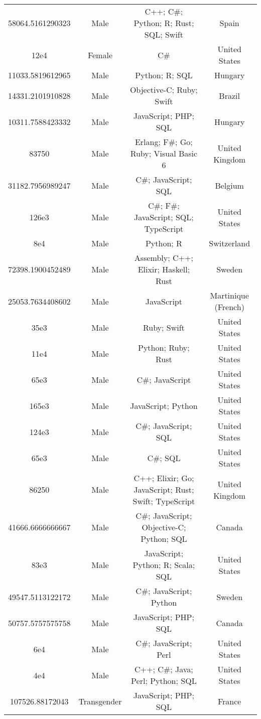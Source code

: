 \begin{center}
\begin{tabular}{ |c|c|c|c| }
58064.5161290323  &  Male  &  C++; C\#; Python; R; Rust; SQL; Swift  &  Spain  \\ 
12e4  &  Female  &  C\#  &  United States  \\ 
11033.5819612965  &  Male  &  Python; R; SQL  &  Hungary  \\ 
14331.2101910828  &  Male  &  Objective-C; Ruby; Swift  &  Brazil  \\ 
10311.7588423332  &  Male  &  JavaScript; PHP; SQL  &  Hungary  \\ 
83750  &  Male  &  Erlang; F\#; Go; Ruby; Visual Basic 6  &  United Kingdom  \\ 
31182.7956989247  &  Male  &  C\#; JavaScript; SQL  &  Belgium  \\ 
126e3  &  Male  &  C\#; F\#; JavaScript; SQL; TypeScript  &  United States  \\ 
8e4  &  Male  &  Python; R  &  Switzerland  \\ 
72398.1900452489  &  Male  &  Assembly; C++; Elixir; Haskell; Rust  &  Sweden  \\ 
25053.7634408602  &  Male  &  JavaScript  &  Martinique (French)  \\ 
35e3  &  Male  &  Ruby; Swift  &  United States  \\ 
11e4  &  Male  &  Python; Ruby; Rust  &  United States  \\ 
65e3  &  Male  &  C\#; JavaScript  &  United States  \\ 
165e3  &  Male  &  JavaScript; Python  &  United States  \\ 
124e3  &  Male  &  C\#; JavaScript; SQL  &  United States  \\ 
65e3  &  Male  &  C\#; SQL  &  United States  \\ 
86250  &  Male  &  C++; Elixir; Go; JavaScript; Rust; Swift; TypeScript  &  United Kingdom  \\ 
41666.6666666667  &  Male  &  C\#; JavaScript; Objective-C; Python; SQL  &  Canada  \\ 
83e3  &  Male  &  JavaScript; Python; R; Scala; SQL  &  United States  \\ 
49547.5113122172  &  Male  &  C\#; JavaScript; Python  &  Sweden  \\ 
50757.5757575758  &  Male  &  JavaScript; PHP; SQL  &  Canada  \\ 
6e4  &  Male  &  C\#; JavaScript; Perl  &  United States  \\ 
4e4  &  Male  &  C++; C\#; Java; Perl; Python; SQL  &  United States  \\ 
107526.88172043  &  Transgender  &  JavaScript; PHP; SQL  &  France  \\ 

\end{tabular}
\end{center}
